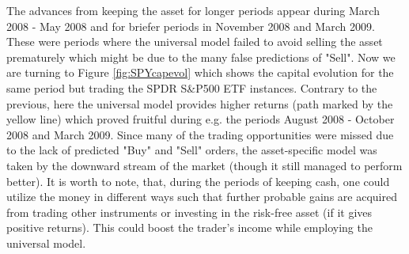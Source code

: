 \documentclass[11pt, a4paper]{article}
\begin{document}
The advances from keeping the asset for longer periods appear during March 2008 - May 2008 and for briefer periods in November 2008 and March 2009. These were periods where the universal model failed to avoid selling the asset prematurely which might be due to the many false predictions of "Sell". Now we are turning to Figure \ref{fig:SPYcapevol} which shows the capital evolution for the same period but trading the SPDR S\&P500 ETF instances. 
Contrary to the previous, here the universal model provides higher returns (path marked by the yellow line) which proved fruitful during e.g. the periods August 2008 - October 2008 and March 2009. Since many of the trading opportunities were missed due to the lack of predicted "Buy" and "Sell" orders, the asset-specific model was taken by the downward stream of the market (though it still managed to perform better). 
It is worth to note, that, during the periods of keeping cash, one could utilize the money in different ways such that further probable gains are acquired from trading other instruments or investing in the risk-free asset (if it gives positive returns). This could boost the trader's income while employing the universal model. 
\end{document}
